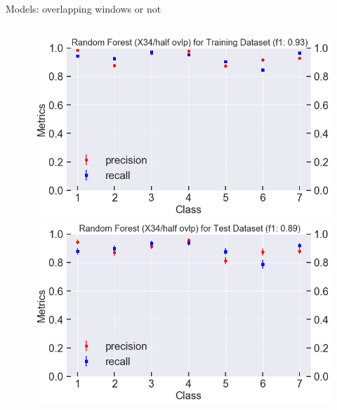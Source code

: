 \documentclass{if-beamer}
\begin{document}
\begin{frame}{Models: overlapping windows or not}
\begin{columns}
\begin{column}{0.5\textwidth}
             \begin{figure}
            \includegraphics[scale=0.2]{./figs/rf_X34_half_train_score.png}
            \includegraphics[scale=0.2]{./figs/rf_X34_half_test_score.png}
            \end{figure}
            
 \end{column}

 \end{columns}
\end{frame}
\end{document}
